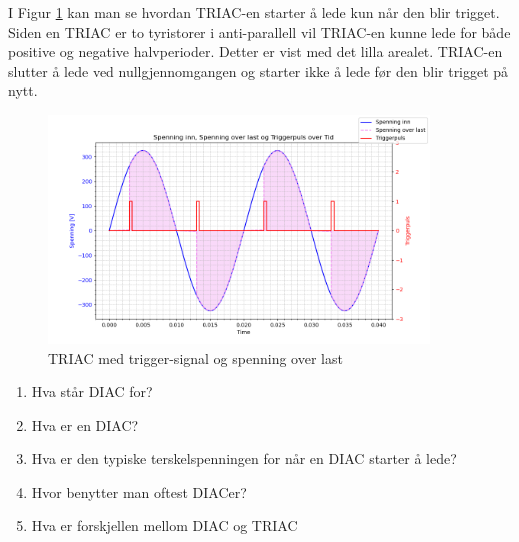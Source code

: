 \begin{solution}[name=Løsningsforslag]
	I Figur \ref{fig:triacTriggplotSOL} kan man se hvordan TRIAC-en starter å lede kun når den blir trigget. Siden en TRIAC er to tyristorer i anti-parallell vil TRIAC-en kunne lede for både positive og negative halvperioder. Detter er vist med det lilla arealet. TRIAC-en slutter å lede ved nullgjennomgangen og starter ikke å lede før den blir trigget på nytt.

	\begin{figure}[H]
		\centering
		\includegraphics[width=0.9\textwidth]{tyristor/plot/triacSOL.png}
		\caption{TRIAC med trigger-signal og spenning over last}
		\label{fig:triacTriggplotSOL}
	\end{figure}

\end{solution}



\begin{question}[name=Spørsmål, topic=tyristor]
	\begin{enumerate}[label=\roman*)]
	\item Hva står DIAC for?
	\item Hva er en DIAC?
	\item Hva er den typiske terskelspenningen for når en DIAC starter å lede?
	\item Hvor benytter man oftest DIACer?
	\item Hva er forskjellen mellom DIAC og TRIAC
	\end{enumerate}

\end{question}

\vspace{0.5cm} %

